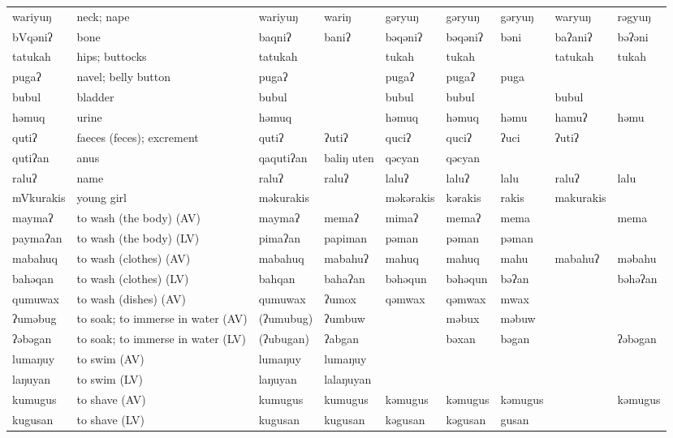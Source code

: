 \begin{landscape}
\begin{longtable}{*{9}{p{}}}
\text{*}wariyuŋ & neck; nape & wariyuŋ & wariŋ & gəryuŋ & gəryuŋ & gəryuŋ & waryuŋ & rəgyuŋ\\
\text{*}bVqəniʔ & bone & baqniʔ & baniʔ & bəqəniʔ & bəqəniʔ & bəni & baʔaniʔ & bəʔəni\\
\text{*}tatukah & hips; buttocks & tatukah &  & tukah & tukah &  & tatukah & tukah\\
\text{*}pugaʔ & navel; belly button & pugaʔ &  & pugaʔ & pugaʔ & puga &  & \\
\text{*}bubul & bladder & bubul &  & bubul & bubul &  & bubul & \\
\text{*}həmuq & urine & həmuq &  & həmuq & həmuq & həmu & hamuʔ & həmu\\
\text{*}qutiʔ & faeces (feces); excrement & qutiʔ & ʔutiʔ & quciʔ & quciʔ & ʔuci & ʔutiʔ & \\
\text{*}qutiʔan & anus & qaqutiʔan & baliŋ uten & qəcyan & qəcyan &  &  & \\
\text{*}raluʔ & name & raluʔ & raluʔ & laluʔ & laluʔ & lalu & raluʔ & lalu\\
\text{*}mVkurakis & young girl & məkurakis &  & məkərakis & kərakis & rakis & makurakis & \\
\text{*}maymaʔ & to wash (the body) (AV) & maymaʔ & memaʔ & mimaʔ & memaʔ & mema &  & mema\\
\text{*}paymaʔan & to wash (the body) (LV) & pimaʔan & papiman & pəman & pəman & pəman &  & \\
\text{*}mabahuq & to wash (clothes) (AV) & mabahuq & mabahuʔ & mahuq & mahuq & mahu & mabahuʔ & məbahu\\
\text{*}bahəqan & to wash (clothes) (LV) & bahqan & bahaʔan & bəhəqun & bəhəqun & bəʔan &  & bəhəʔan\\
\text{*}qumuwax & to wash (dishes) (AV) & qumuwax & ʔumox & qəmwax & qəmwax & mwax &  & \\
\text{*}ʔuməbug & to soak; to immerse in water (AV) & (ʔumubug) & ʔumbuw &  & məbux & məbuw &  & \\
\text{*}ʔəbəgan & to soak; to immerse in water (LV) & (ʔubugan) & ʔabgan &  & bəxan & bəgan &  & ʔəbəgan\\
\text{*}lumaŋuy & to swim (AV) & lumaŋuy & lumaŋuy &  &  &  &  & \\
\text{*}laŋuyan & to swim (LV) & laŋuyan & lalaŋuyan &  &  &  &  & \\
\text{*}kumugus & to shave (AV) & kumugus & kumugus & kəmugus & kəmugus & kəmugus &  & kəmugus\\
\text{*}kugusan & to shave (LV) & kugusan & kugusan & kəgusan & kəgusan & gusan &  & \\

\end{longtable}
\end{landscape}

